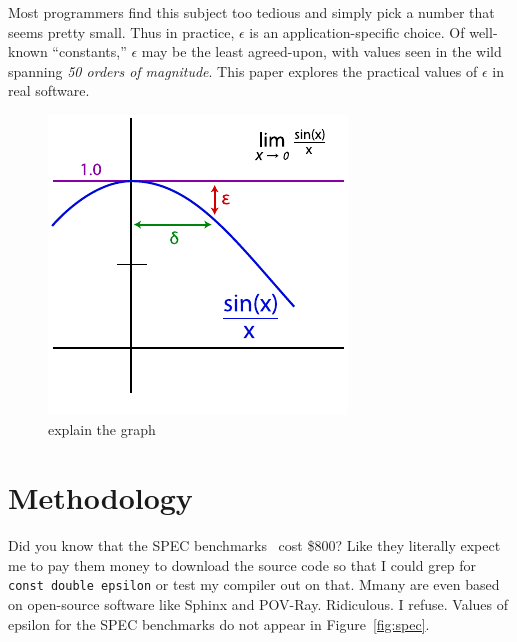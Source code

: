 \documentclass[twocolumn]{article}
\begin{document}
Most programmers find this subject too tedious and simply pick a
number that seems pretty small. Thus in practice, $\epsilon$ is an
application-specific choice. Of well-known ``constants,''
$\epsilon$ may be the least agreed-upon, with values seen in the wild
spanning {\em 50 orders of magnitude}. This paper explores the practical
values of $\epsilon$ in real software.

\begin{figure}[ht]
\begin{center}
\includegraphics[width=0.90 \linewidth]{epsilondelta.pdf}
\end{center}\vspace{-0.1in}
\caption{explain the graph}
\label{fig:epsilondelta}
\end{figure}

\section{Methodology}


Did you know that the SPEC benchmarks~\cite{spec2006} cost \$800? Like
they literally expect me to pay them money to download the source code
so that I could grep for {\tt const double epsilon} or test my
compiler out on that. Mmany are even based on open-source software like
Sphinx and POV-Ray. Ridiculous. I refuse. Values of epsilon for the
SPEC benchmarks do not appear in Figure~\ref{fig:spec}.
\end{document}
